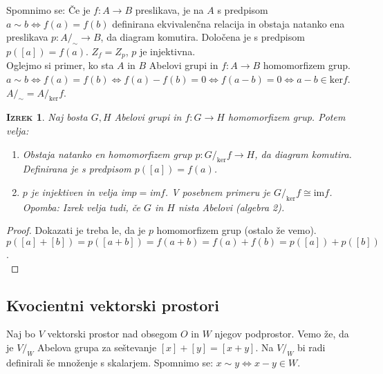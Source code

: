 \documentclass[a4paper,12pt]{article}
\newtheorem*{izrek}{\textsc{Izrek}}
\begin{document}
Spomnimo se: Če je $f:A\to B$ preslikava, je na $A$ s predpisom $a\sim b \Leftrightarrow f(a)=f(b)$ definirana ekvivalenčna relacija in obstaja natanko ena preslikava $p: A/_\sim \to B$, da diagram \Smiley{} komutira. Določena je s predpisom $p([a])=f(a)$. $Z_f=Z_p$, $p$ je injektivna. \\

Oglejmo si primer, ko sta $A$ in $B$ Abelovi grupi in $f:A\to B$ homomorfizem grup. \\

$a\sim b \Leftrightarrow f(a)=f(b) \Leftrightarrow f(a)-f(b) = 0  \Leftrightarrow f(a-b)=0 \Leftrightarrow a-b\in \text{ker}f$. \\

$A/_\sim = A/_\text{ker}f$. \\

\begin{izrek}
Naj bosta $G,H$ Abelovi grupi in $f:G\to H$ homomorfizem grup. Potem velja:
\begin{enumerate}
\item Obstaja natanko en homomorfizem grup $p:G/_\text{ker}f \to H$, da diagram \Smiley{} komutira. Definirana je s predpisom $p([a])=f(a)$. 
\item $p$ je injektiven in velja im$p=$im$f$. V posebnem primeru je $G/_\text{ker}f \cong \text{im}f$. \\

Opomba: Izrek velja tudi, če $G$ in $H$ nista Abelovi (algebra 2).\\ 
\end{enumerate}
\end{izrek}

\begin{proof}
Dokazati je treba le, da je $p$ homomorfizem grup (ostalo že vemo). \\

$p([a]+[b])=p([a+b])=f(a+b)=f(a)+f(b)=p([a])+p([b])$. \\
\end{proof}

\newpage

\subsection{Kvocientni vektorski prostori}

Naj bo $V$ vektorski prostor nad obsegom $O$ in $W$ njegov podprostor. Vemo že, da je $V/_W$ Abelova grupa za seštevanje $[x]+[y]=[x+y]$. Na $V/_W$ bi radi definirali še množenje s skalarjem. Spomnimo se: $x\sim y \Leftrightarrow x-y\in W$.\\
\end{document}
